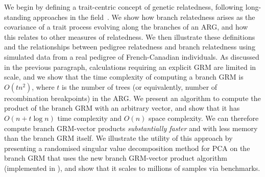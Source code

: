 We begin by defining a trait-centric concept of genetic relatedness, following
long-standing approaches in the 
field~\citep{fisher1919correlation, wright1922coefficients}. 
We show how branch relatedness arises as the
covariance of a trait process evolving along the branches of an ARG, and how
this relates to other measures of relatedness.
We then illustrate these definitions and the relationships between pedigree
relatedness and branch relatedness using simulated data from a real pedigree of
French-Canadian individuals. 
As discussed in the previous paragraph, calculations requiring an explicit 
GRM are limited in scale, and we show that the time complexity of 
computing a branch GRM is 
$O(t n^2)$, where $t$ is the number of trees (or equivalently, number 
of recombination breakpoints) in the ARG.
We present an algorithm to compute the product of the branch GRM with
an arbitrary vector, and show that it has 
$O(n + t \log{n})$ time complexity and $O(n)$ space complexity.
We can therefore compute branch GRM-vector products 
\emph{substantially faster} and with less memory 
than the branch GRM itself.
We illustrate the utility of this approach by presenting a 
randomised singular value decomposition method 
for PCA on the branch GRM that
uses the new branch GRM-vector product algorithm (implemented 
in \tskit{}), and show that it scales to millions of samples
via benchmarks.
